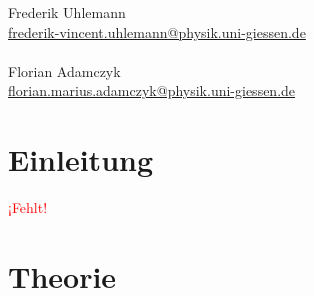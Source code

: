 \documentclass[12pt,a4paper,ngerman]{report}
\providecommand{\fehlt}{\textcolor{red}{{ ¡Fehlt! }}}
\begin{document}
\begin{titlepage}
\begin{minipage}{0.49\textwidth}
\begin{flushright}
				\large{Frederik Uhlemann}\\
				\small{\href{mailto:frederik-vincent.uhlemann@physik.uni-giessen.de}{frederik-vincent.uhlemann@physik.uni-giessen.de}\\~\\
				}
				\large{Florian Adamczyk} \\
				\small{\href{mailto:florian.marius.adamczyk@physik.uni-giessen.de}{florian.marius.adamczyk@physik.uni-giessen.de}\\
			}
		\end{flushright}
	\end{minipage}
	
	\end{titlepage}
	
\setcounter{secnumdepth}{3}
\setcounter{tocdepth}{4}
\tableofcontents


	
\chapter*{Einleitung}
	\fehlt


\chapter{Theorie}
\end{document}
